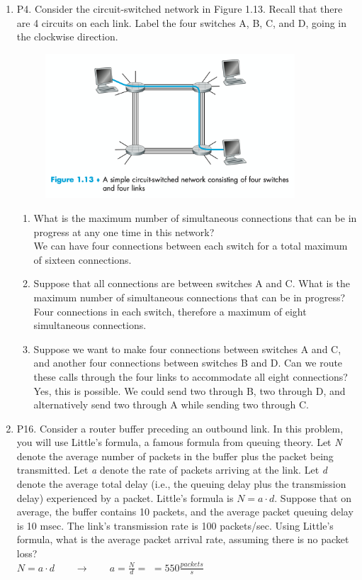 \documentclass[12pt]{article}
\begin{document}
\begin{enumerate}
\item P4. Consider the circuit-switched network in Figure 1.13. Recall that there are 4 circuits on each link. Label the four switches A, B, C, and D, going in the clockwise direction.
    \begin{figure}[h!]
    \centering
    \includegraphics[width=0.88\textwidth]{Fig1.13.png}
    \end{figure}
    \begin{enumerate}
        \item What is the maximum number of simultaneous connections that can be in progress at any one time in this network?\\[1em]
        We can have four connections between each switch for a total maximum of sixteen connections.
        \item Suppose that all connections are between switches A and C. What is the maximum number of simultaneous connections that can be in progress?\\[1em]
        Four connections in each switch, therefore a maximum of eight simultaneous connections.
        \item Suppose we want to make four connections between switches A and C, and another four connections between switches B and D. Can we route these calls through the four links to accommodate all eight connections?\\[1em]
        Yes, this is possible. We could send two through B, two through D, and alternatively send two through A while sending two through C.
    \end{enumerate}
\newpage
\item P16. Consider a router buffer preceding an outbound link. In this problem, you will use Little’s formula, a famous formula from queuing theory. Let \textit{N} denote the average number of packets in the buffer plus the packet being transmitted. Let \textit{a} denote the rate of packets arriving at the link. Let \textit{d} denote the average total delay (i.e., the queuing delay plus the transmission delay) experienced by a packet. Little’s formula is \(N  =  a \cdot d\). Suppose that on average, the buffer contains 10 packets, and the average packet queuing delay is 10 msec. The link’s transmission rate is 100 packets/sec. Using Little’s formula, what is the average packet arrival rate, assuming there is no packet loss?\\[1em]
\(N=a\cdot d\qquad
\rightarrow\qquad
a=\frac{N}{d}=\)
\(=550 \frac{packets}{s}\)


\end{enumerate}
\end{document}
